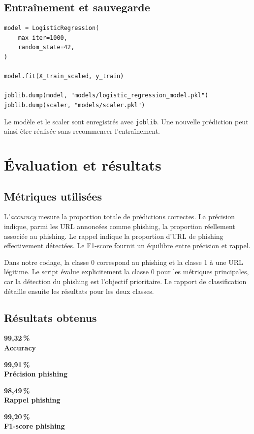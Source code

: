 \documentclass[11pt,a4paper]{report}
\newcommand{\metric}[2]{%
  \begin{minipage}[t]{0.22\textwidth}
    \centering
    \colorbox{cmrpilight}{\parbox[c][1.6cm][c]{0.92\linewidth}{%
      \centering\Large\bfseries\color{cmrpiblue}#1\\[-1mm]
      \normalsize\color{black}#2}}
  \end{minipage}
}
\begin{document}
\section{Entraînement et sauvegarde}

\begin{lstlisting}[caption={Entraînement de la régression logistique}]
model = LogisticRegression(
    max_iter=1000,
    random_state=42,
)

model.fit(X_train_scaled, y_train)

joblib.dump(model, "models/logistic_regression_model.pkl")
joblib.dump(scaler, "models/scaler.pkl")
\end{lstlisting}

Le modèle et le scaler sont enregistrés avec \texttt{joblib}. Une nouvelle
prédiction peut ainsi être réalisée sans recommencer l'entraînement.

\chapter{Évaluation et résultats}

\section{Métriques utilisées}

L'\emph{accuracy} mesure la proportion totale de prédictions correctes. La
précision indique, parmi les URL annoncées comme phishing, la proportion
réellement associée au phishing. Le rappel indique la proportion d'URL de
phishing effectivement détectées. Le F1-score fournit un équilibre entre
précision et rappel.

Dans notre codage, la classe 0 correspond au phishing et la classe 1 à une URL
légitime. Le script évalue explicitement la classe 0 pour les métriques
principales, car la détection du phishing est l'objectif prioritaire. Le rapport
de classification détaille ensuite les résultats pour les deux classes.

\section{Résultats obtenus}

\begin{center}
\metric{99,32\,\%}{Accuracy}\hfill
\metric{99,91\,\%}{Précision phishing}\hfill
\metric{98,49\,\%}{Rappel phishing}\hfill
\metric{99,20\,\%}{F1-score phishing}
\end{center}
\end{document}
